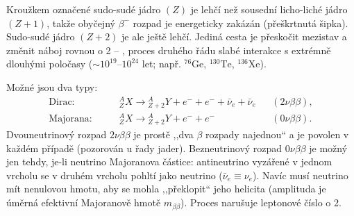 \begin{center}
\end{center}

Kroužkem označené sudo-sudé jádro \((Z)\) je lehčí než sousední licho-liché jádro \((Z+1)\),
takže obyčejný \(\beta^-\) rozpad je energeticky zakázán (přeškrtnutá šipka). Sudo-sudé jádro
\((Z+2)\) je ale ještě lehčí. Jediná cesta je přeskočit mezistav a změnit náboj rovnou o 2 --
, proces druhého řádu slabé interakce s extrémně dlouhými
poločasy (\(\sim10^{19}\)--\(10^{24}\) let; např. \({}^{76}\mathrm{Ge}\), \({}^{130}\mathrm{Te}\),
\({}^{136}\mathrm{Xe}\)).

Možné jsou dva typy:
\begin{align*}
  \text{Dirac:}\qquad & {}^{A}_{Z}X \to {}^{A}_{Z+2}Y + e^- + e^- + \bar\nu_e + \bar\nu_e
     && (2\nu\beta\beta),\\
  \text{Majorana:}\qquad & {}^{A}_{Z}X \to {}^{A}_{Z+2}Y + e^- + e^- && (0\nu\beta\beta).
\end{align*}
Dvouneutrinový rozpad \(2\nu\beta\beta\) je prostě ,,dva \(\beta\) rozpady najednou`` a je povolen
v každém případě (pozorován u řady jader). Bezneutrinový rozpad \(0\nu\beta\beta\) je možný jen
tehdy, je-li neutrino Majoranova částice: antineutrino vyzářené v jednom vrcholu se v druhém
vrcholu pohltí jako neutrino (\(\bar\nu_e\equiv\nu_e\)). Navíc musí neutrino mít nenulovou
hmotu, aby se mohla ,,překlopit`` jeho helicita (amplituda je úměrná efektivní Majoranově
hmotě \(m_{\beta\beta}\)). Proces narušuje leptonové číslo o 2.

